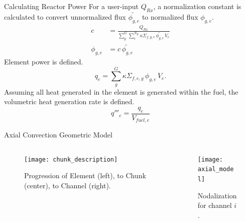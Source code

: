 \begin{frame}{Calculating Reactor Power}
  For a user-input $Q_{Rx}$, a normalization constant is calculated to convert
  unnormalized flux $\widetilde{\phi_{g,e}}$ to normalized flux $\phi_{g,e}$.
  \begin{align}
    \label{eq:normalization_c}
    c &= \frac{Q_{Rx}}{\sum_{g}^{G} \sum_{e}^{N_E} \kappa \Sigma_{f,g,e} \,
      \widetilde{\phi_{g,e}} \, V_e} \\
    \phi_{g,e} &= c \, \widetilde{\phi_{g,e}}
  \end{align}
  Element power is defined.
  \begin{equation}
    \label{eq:elementpwr}
    q_{e} = \sum_g^G \kappa \Sigma_{f,e,g} \, \phi_{g,e} \, V_e .
  \end{equation}
  Assuming all heat generated in the element is generated within the fuel, the
  volumetric heat generation rate is defined.
  \begin{equation}
    \label{eq:elementqppp_fuel}
    q'''_{e} = \frac{q_e}{V_{fuel,e}}
  \end{equation}
\end{frame}

\begin{frame}{Axial Convection Geometric Model}
  \begin{columns}
    \begin{column}{0.5\textwidth}
      \begin{figure}
        \centering
        \texttt{[image: chunk\_description]}
        \caption{Progression of Element (left), to Chunk (center), to Channel
          (right).}
        \label{fig:chunk_description}
      \end{figure}
    \end{column}
    \begin{column}{0.5\textwidth}
      \begin{figure}
        \centering
        \texttt{[image: axial\_model]}
        \caption{Nodalization for channel $i$.}
        \label{fig:axial_model}
      \end{figure}
    \end{column}
  \end{columns}
\end{frame}

